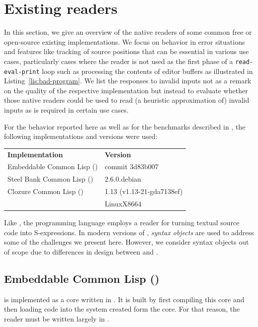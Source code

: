 \section{Existing \cl{} readers}

In this section, we give an overview of the native readers of some
common free or open-source existing \cl{} implementations.  We focus
on behavior in error situations and features like tracking of source
positions that can be essential in various use cases, particularly
cases where the reader is not used as the first phase of a
\texttt{read-eval-print} loop such as processing the contents of
editor buffers as illustrated in Listing~\ref{lis:bad-program}.  We
list the responses to invalid inputs not as a remark on the quality of
the respective implementation but instead to evaluate whether those
native readers could be used to read (a heuristic approximation of)
invalid inputs as is required in certain use cases.

For the behavior reported here as well as for the benchmarks described
in , the following implementations and
versions were used:

\vspace{1em}\noindent%
\begin{tabular}{ll}
  \textbf{Implementation}          & \textbf{Version}\\
  Embeddable Common Lisp (\ecl{})  & commit 3d83b007\\
  Steel Bank Common Lisp (\sbcl{}) & 2.6.0.debian\\
  Clozure Common Lisp (\ccl{})     & 1.13 (v1.13-21-gda7138ef)\\
                                   & LinuxX8664
\end{tabular}
\vspace{1em}

Like \cl{}, the \scheme{} programming language employs a reader for
turning textual source code into S-expressions.  In modern versions of
\scheme{}, \emph{syntax objects} are used to address some of the
challenges we present here.  However, we consider syntax objects out
of scope due to differences in design between \scheme{} and \cl{}.

\subsection{Embeddable Common Lisp (\ecl{})}

\ecl{} is implemented as a core written in \clanguage{}.  It is built
by first compiling this core and then loading \cl{} code into the
system created form the core.  For that reason, the reader must be
written largely in \clanguage{}.

